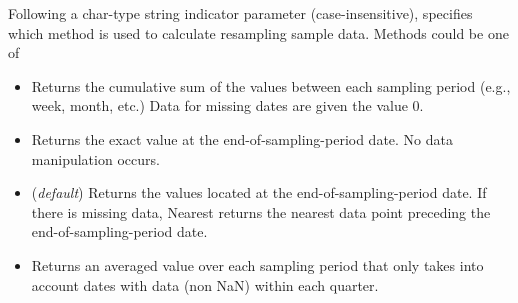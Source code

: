  Following a char-type string indicator parameter  (case-insensitive),
 specifies which method is used to calculate resampling sample data.
 Methods could be one of
 \begin{itemize}
 \item {}
 Returns the cumulative sum of the values between each sampling period (e.g., week, month, etc.)
 Data for missing dates are given the value 0.
 \item {}
 Returns the exact value at the end-of-sampling-period date. No data manipulation occurs.
 \item {}
 (\emph{default}) Returns the values located at the end-of-sampling-period date. 
 If there is missing data, Nearest returns the nearest data point preceding the end-of-sampling-period date. 
 \item {}
 Returns an averaged value over each sampling period 
 that only takes into account dates with data (non NaN) within each quarter.
 \end{itemize}

